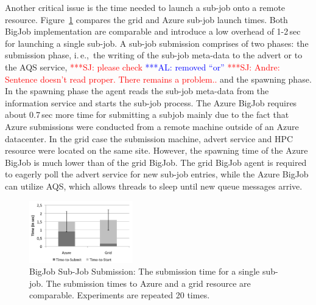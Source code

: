 \documentclass[conference,final]{IEEEtran}
\newcommand{\alnote}[1]{ {\textcolor{blue} { ***AL: #1 }}}
\newcommand{\jhanote}[1]{ {\textcolor{red} { ***SJ: #1 }}}
\newcommand{\alnote}[1]{}
\newcommand{\jhanote}[1]{}
\begin{document}
Another critical issue is the time needed to launch a sub-job onto a
remote resource. Figure~\ref{fig:performance_startup} compares the
grid and Azure sub-job launch times. Both BigJob implementation are
comparable and introduce a low overhead of 1-2\,sec for launching a
single sub-job.
A sub-job submission comprises of two phases: the submission phase,
i.\,e.,\ the writing of the sub-job meta-data to the advert
or to the AQS service, \jhanote{please check}
\alnote{removed ``or''} \jhanote{Andre: Sentence doesn't read
  proper. There remains a problem..} and the spawning phase. In the
spawning phase the agent reads the sub-job meta-data from the
information service and starts the sub-job process. The Azure BigJob
requires about 0.7\,sec more time for submitting a subjob mainly due
to the fact that Azure submissions were conducted from a remote
machine outside of an Azure datacenter. In the grid case the
submission machine, advert service and HPC resource were located on
the same site.  However, the spawning time of the Azure BigJob is much
lower than of the grid BigJob. The grid BigJob agent is required to
eagerly poll the advert service for new sub-job entries, while the
Azure BigJob can utilize AQS, which allows threads to sleep until new
queue messages arrive.
\begin{figure}[htbp]
    \centering
        \includegraphics[width=0.4\textwidth]{performance/startup.pdf}
        \caption{BigJob Sub-Job Submission: The submission time for
          a single sub-job. The submission times to Azure and a grid
          resource are comparable. Experiments are repeated 20 times.
          }
    \label{fig:performance_startup}
\end{figure}
\end{document}
